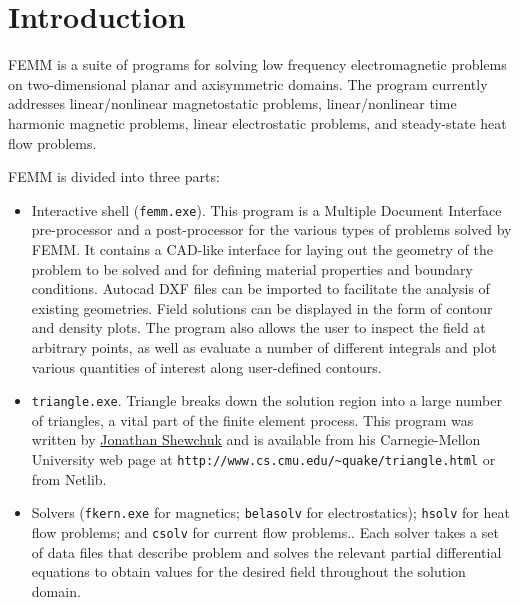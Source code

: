 \documentclass[12pt]{report}
\begin{document}
\chapter{Introduction}

FEMM is a suite of programs for solving low frequency
electromagnetic problems on two-dimensional planar and axisymmetric
domains.  The program currently addresses linear/nonlinear
magnetostatic problems, linear/nonlinear time harmonic magnetic
problems, linear electrostatic problems, and steady-state heat
flow problems.

FEMM is divided into three parts:

\begin{itemize}
\item Interactive shell ({\tt femm.exe}).  This program is a Multiple
Document Interface pre-processor and a post-processor for the
various types of problems solved by FEMM. It contains a CAD-like
interface for laying out the geometry of the problem to be solved
and for defining material properties and boundary conditions.
Autocad DXF files can be imported to facilitate the analysis of
existing geometries. Field solutions can be displayed in the form
of contour and density plots.  The program also allows the user to
inspect the field at arbitrary points, as well as evaluate a number
of different integrals and plot various quantities of interest
along user-defined contours.

\item {\tt triangle.exe}.  Triangle breaks down the solution
region into a large number of triangles, a vital part of the finite
element process.  This program was written by
\href{http://www.cs.cmu.edu/~quake/triangle.html}{Jonathan Shewchuk}
and is available from his Carnegie-Mellon University web
page at \verb+http://www.cs.cmu.edu/~quake/triangle.html+ or from Netlib.

\item Solvers ({\tt fkern.exe} for magnetics; {\tt belasolv} for
electrostatics); {\tt hsolv} for heat flow problems; and
{\tt csolv} for current flow problems.. Each
solver takes a set of data files that describe problem and solves
the relevant partial differential equations to obtain values for
the desired field throughout the solution domain.
\end{itemize}
\end{document}

